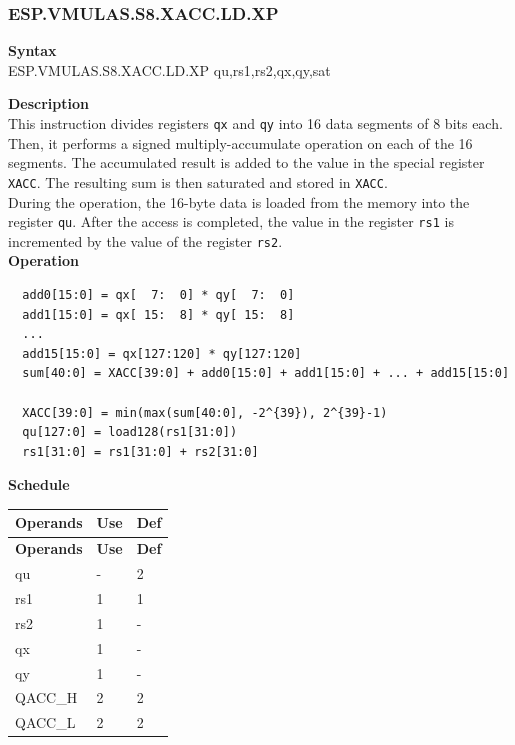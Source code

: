 \newpage
\subsubsection{ESP.VMULAS.S8.XACC.LD.XP}\label{instruction:ESPVMULASS8XACCLDXP}
\textbf{Syntax}\\
ESP.VMULAS.S8.XACC.LD.XP qu,rs1,rs2,qx,qy,sat

\textbf{Description}\\

This instruction divides registers \lstinline{qx} and \lstinline{qy} into 16 data segments of 8 bits each. Then, it performs a signed multiply-accumulate operation on each of the 16 segments. The accumulated result is added to the value in the special register \lstinline{XACC}. The resulting sum is then saturated and stored in \lstinline{XACC}. \\ During the operation, the 16-byte data is loaded from the memory into the register \lstinline{qu}. After the access is completed, the value in the register \lstinline{rs1} is incremented by the value of the register \lstinline{rs2}.\\
\textbf{Operation}
\begin{lstlisting}
  add0[15:0] = qx[  7:  0] * qy[  7:  0]
  add1[15:0] = qx[ 15:  8] * qy[ 15:  8]
  ...
  add15[15:0] = qx[127:120] * qy[127:120]
  sum[40:0] = XACC[39:0] + add0[15:0] + add1[15:0] + ... + add15[15:0]

  XACC[39:0] = min(max(sum[40:0], -2^{39}), 2^{39}-1)
  qu[127:0] = load128(rs1[31:0])
  rs1[31:0] = rs1[31:0] + rs2[31:0]
\end{lstlisting}

\textbf{Schedule}\\
\begin{longtable}[c]{|l|l|l|}
    \hline
    \rowcolor{lightgray}
    \textbf{Operands} & \textbf{Use} & \textbf{Def} \\\hline
    \endfirsthead
    \hline
    \rowcolor{lightgray}
     \textbf{Operands} & \textbf{Use} & \textbf{Def} \\\hline
    \endhead
    \hline
    \endfoot

    qu & - & 2 \\\hline
    rs1 & 1 & 1 \\\hline
    rs2 & 1 & - \\\hline
     qx & 1 & - \\\hline
     qy & 1 & - \\\hline
     QACC\_H & 2 & 2 \\\hline
     QACC\_L & 2 & 2

\end{longtable}

